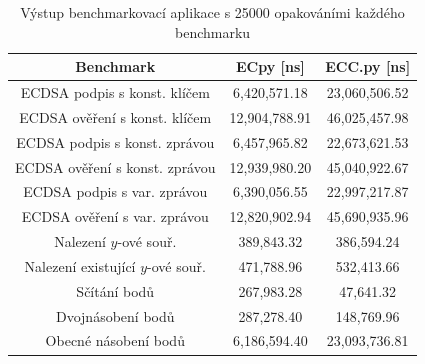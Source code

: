 \documentclass{article}
\theoremstyle{definition}
\begin{document}
    \begin{table}[!ht]
        \centering
        \begin{tabular}{|c|c|c|}
            \hline
Benchmark & ECpy [ns] & ECC.py [ns] \\ \hline \hline
ECDSA podpis s konst. klíčem & 6,420,571.18 & 23,060,506.52 \\ 
ECDSA ověření s konst. klíčem & 12,904,788.91 & 46,025,457.98 \\ 
ECDSA podpis s konst. zprávou & 6,457,965.82 & 22,673,621.53 \\ 
ECDSA ověření s konst. zprávou & 12,939,980.20 & 45,040,922.67 \\ 
ECDSA podpis s var. zprávou & 6,390,056.55 & 22,997,217.87 \\ 
ECDSA ověření s var. zprávou & 12,820,902.94 & 45,690,935.96 \\ \hline
Nalezení $y$-ové souř. & 389,843.32 & 386,594.24 \\ 
Nalezení existující $y$-ové souř. & 471,788.96 & 532,413.66 \\ \hline
Sčítání bodů & 267,983.28 & 47,641.32 \\ 
Dvojnásobení bodů & 287,278.40 & 148,769.96 \\ 
Obecné násobení bodů & 6,186,594.40 & 23,093,736.81 \\ \hline
        \end{tabular}
        \caption{Výstup benchmarkovací aplikace s 25000 opakováními každého benchmarku}
        \label{Tab:results-25000}
    \end{table}
\end{document}
